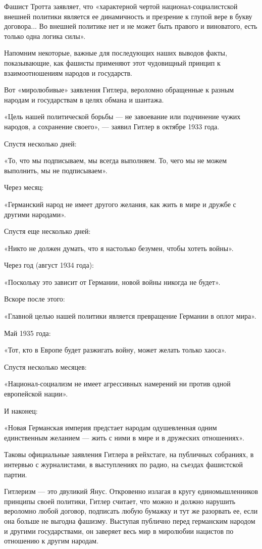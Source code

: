 \documentclass[12pt, a4paper, openany]{book}
\begin{document}
Фашист Тротта заявляет, что «характерной чертой национал-социалистской внешней политики является ее динамичность и презрение к глупой вере в букву договора... Во внешней политике нет и не может быть правого и виноватого, есть только одна логика силы».

Напомним некоторые, важные для последующих наших выводов факты, показывающие, как фашисты применяют этот чудовищный принцип к взаимоотношениям народов и государств.

Вот «миролюбивые» заявления Гитлера, вероломно обращенные к разным народам и государствам в целях обмана и шантажа.

«Цель нашей политической борьбы — не завоевание или подчинение чужих народов, а сохранение своего», — заявил Гитлер в октябре 1933 года.

Спустя несколько дней:

«То, что мы подписываем, мы всегда выполняем. То, чего мы не можем выполнить, мы не подписываем».

Через месяц:

«Германский народ не имеет другого желания, как жить в мире и дружбе с другими народами».

Спустя еще несколько дней:

«Никто не должен думать, что я настолько безумен, чтобы хотеть войны».

Через год (август 1934 года):

«Поскольку это зависит от Германии, новой войны никогда не будет».

Вскоре после этого:
	
«Главной целью нашей политики является превращение Германии в оплот мира».

Май 1935 года:

«Тот, кто в Европе будет разжигать войну, может желать только хаоса».

Спустя несколько месяцев:

«Национал-социализм не имеет агрессивных намерений ни против одной европейской нации».

И наконец:

«Новая Германская империя предстает народам одушевленная одним единственным желанием — жить с ними в мире и в дружеских отношениях».

Таковы официальные заявления Гитлера в рейхстаге, на публичных собраниях, в интервью с журналистами, в выступлениях по радио, на съездах фашистской партии.

Гитлеризм — это двуликий Янус. Откровенно излагая в кругу единомышленников принципы своей политики, Гитлер считает, что можно и должно нарушить вероломно любой договор, подписать любую бумажку и тут же разорвать ее, если она больше не выгодна фашизму. Выступая публично перед германским народом и другими государствами, он заверяет весь мир в миролюбии нацистов по отношению к другим народам.
\end{document}
